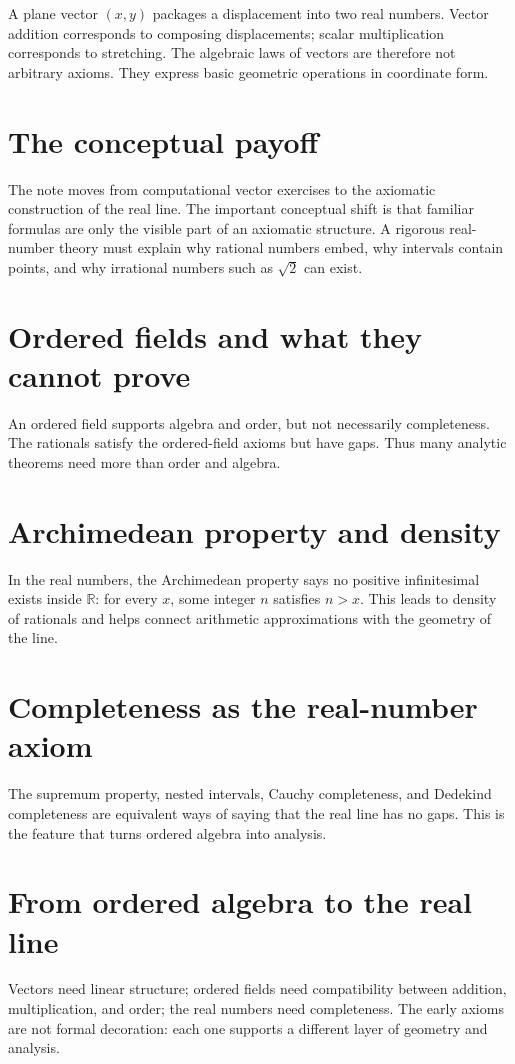 A plane vector \((x,y)\) packages a displacement into two real numbers.  Vector addition corresponds to composing displacements; scalar multiplication corresponds to stretching.  The algebraic laws of vectors are therefore not arbitrary axioms.  They express basic geometric operations in coordinate form.

\section{The conceptual payoff}

The note moves from computational vector exercises to the axiomatic construction of the real line.  The important conceptual shift is that familiar formulas are only the visible part of an axiomatic structure.  A rigorous real-number theory must explain why rational numbers embed, why intervals contain points, and why irrational numbers such as \(\sqrt2\) can exist.

\section{Ordered fields and what they cannot prove}

An ordered field supports algebra and order, but not necessarily completeness.  The rationals satisfy the ordered-field axioms but have gaps.  Thus many analytic theorems need more than order and algebra.

\section{Archimedean property and density}

In the real numbers, the Archimedean property says no positive infinitesimal exists inside \(\mathbb R\): for every \(x\), some integer \(n\) satisfies \(n>x\).  This leads to density of rationals and helps connect arithmetic approximations with the geometry of the line.

\section{Completeness as the real-number axiom}

The supremum property, nested intervals, Cauchy completeness, and Dedekind completeness are equivalent ways of saying that the real line has no gaps.  This is the feature that turns ordered algebra into analysis.

\section{From ordered algebra to the real line}

Vectors need linear structure; ordered fields need compatibility between addition, multiplication, and order; the real numbers need completeness.  The early axioms are not formal decoration: each one supports a different layer of geometry and analysis.
